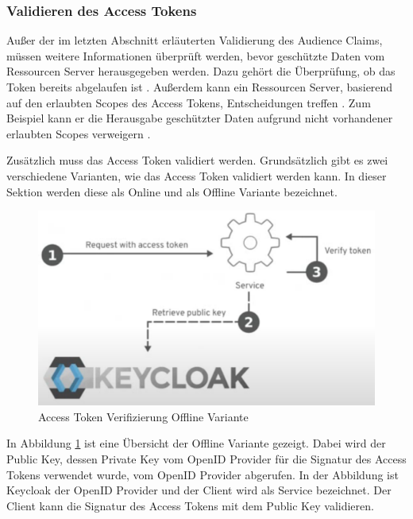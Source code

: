 \subsubsection{Validieren des Access Tokens} \label{EB_Validieren des Access Tokens}

Außer der im letzten Abschnitt erläuterten Validierung des Audience Claims, müssen weitere Informationen überprüft werden, bevor geschützte Daten vom Ressourcen Server herausgegeben werden. Dazu gehört die Überprüfung, ob das Token bereits abgelaufen ist \cite[Sec. 4.1.4]{SSEB_RFC7519}. Außerdem kann ein Ressourcen Server, basierend auf den erlaubten Scopes des Access Tokens, Entscheidungen treffen \cite[Sec. 3.3]{SSEB_RFC6749}. Zum Beispiel kann er die Herausgabe geschützter Daten aufgrund nicht vorhandener erlaubten Scopes verweigern \cite[Sec. 3.3]{SSEB_RFC6749}.

Zusätzlich muss das Access Token validiert werden. Grundsätzlich gibt es zwei verschiedene Varianten, wie das Access Token validiert werden kann. In dieser Sektion werden diese als Online und als Offline Variante bezeichnet.

\begin{figure}[!ht]
	\centering
	\includegraphics[width=.8\textwidth]{Images/EbertScherer/VerifyAccessTokenOffline.PNG}
	\caption{Access Token Verifizierung Offline Variante \cite{EB32}}
	\label{fig:EB_Access Token Verifizierung Offline Variante}
\end{figure}

In Abbildung \ref{fig:EB_Access Token Verifizierung Offline Variante} ist eine Übersicht der Offline Variante gezeigt. Dabei wird der Public Key, dessen Private Key vom OpenID Provider für die Signatur des Access Tokens verwendet wurde, vom OpenID Provider abgerufen. In der Abbildung ist Keycloak der OpenID Provider und der Client wird als Service bezeichnet. Der Client kann die Signatur des Access Tokens mit dem Public Key validieren.

